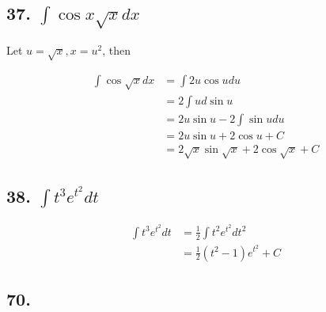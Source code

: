 \documentclass{article}
\begin{document}
    \subsection*{37. $\int \cos x \sqrt x dx$}

    Let $u = \sqrt x, x = u^2$, then 

    $$\begin{aligned}
        \int \cos \sqrt x dx &= \int 2u \cos u du \\
        &= 2\int u d\sin u \\
        &= 2 u \sin u - 2 \int \sin u du \\
        &= 2 u \sin u + 2 \cos u + C \\
        &= 2 \sqrt x \sin \sqrt x + 2 \cos \sqrt x + C
    \end{aligned}$$

    \subsection*{38. $\int t^3e^{t^2} dt$}

    $$\begin{aligned}
        \int t^3e^{t^2} dt &= \frac 1 2 \int t^2 e^{t^2} d t^2 \\
        &= \frac 1 2(t^2 - 1)e^{t^2} + C
    \end{aligned}$$
    
    \subsection*{70. }
\end{document}
